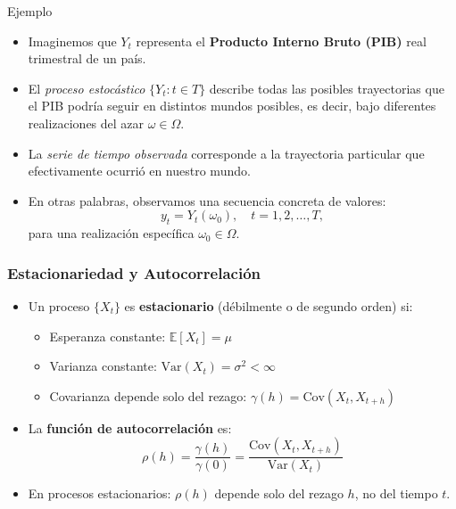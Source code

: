 \documentclass{beamer}
\begin{document}
\begin{frame}{Ejemplo}
\small
\begin{itemize}
    \item Imaginemos que \( Y_t \) representa el \textbf{Producto Interno Bruto (PIB)} real trimestral de un país.
    
    \item El \emph{proceso estocástico} \( \{ Y_t : t \in T \} \) describe todas las posibles trayectorias 
    que el PIB podría seguir en distintos mundos posibles, es decir, bajo diferentes realizaciones 
    del azar \( \omega \in \Omega \).
    
    \item La \emph{serie de tiempo observada} corresponde a la trayectoria particular que efectivamente 
    ocurrió en nuestro mundo.
    
    \item En otras palabras, observamos una secuencia concreta de valores:
    \[
    y_t = Y_t(\omega_0), \quad t = 1, 2, \dots, T,
    \]
    para una realización específica \( \omega_0 \in \Omega \).
\end{itemize}
\end{frame}




\begin{frame}
\frametitle{Estacionariedad y Autocorrelación}
\begin{itemize}
    \item  Un proceso \(\{X_t\}\) es \textbf{estacionario } (débilmente o de segundo orden) si:
    \begin{itemize}
        \item Esperanza constante: \(\mathbb{E}[X_t] = \mu\)
        \item Varianza constante: \(\text{Var}(X_t) = \sigma^2 < \infty\)
        \item Covarianza depende solo del rezago: \(\gamma(h) = \text{Cov}(X_t, X_{t+h})\)
    \end{itemize}
    \item La \textbf{función de autocorrelación} es:
    \[
    \rho(h) = \frac{\gamma(h)}{\gamma(0)} = \frac{\text{Cov}(X_t, X_{t+h})}{\text{Var}(X_t)}
    \]
    \item En procesos estacionarios: \(\rho(h)\) depende solo del rezago \(h\), no del tiempo \(t\).
\end{itemize}
\end{frame}
\end{document}
